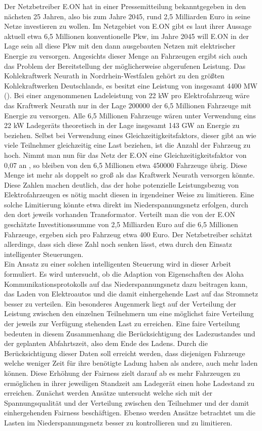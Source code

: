 Der Netzbetreiber E.ON hat in einer Pressemitteilung \cite{eon_presse} bekanntgegeben in den nächsten 25 Jahren, also bis zum Jahre 2045, rund 2,5 Milliarden Euro in seine Netze investieren zu wollen. Im Netzgebiet von E.ON gibt es laut ihrer Aussage aktuell etwa 6,5 Millionen konventionelle Pkw, im Jahre 2045 will E.ON in der Lage sein all diese Pkw mit den dann ausgebauten Netzen mit elektrischer Energie zu versorgen. Angesichts dieser Menge an Fahrzeugen ergibt sich auch das Problem der Bereitstellung der möglicherweise abgerufenen Leistung. Das Kohlekraftwerk Neurath in Nordrhein-Westfalen gehört zu den größten Kohlekraftwerken Deutschlands, es besitzt eine Leistung von insgesamt 4400 MW (\cite{power}). Bei einer angenommenen Ladeleistung von 22 kW pro Elektrofahrzeug wäre das Kraftwerk Neurath nur in der Lage 200000 der 6,5 Millionen Fahrzeuge mit Energie zu versorgen. Alle 6,5 Millionen Fahrzeuge wären unter Verwendung eins 22 kW Ladegeräts theoretisch in der Lage insgesamt 143 GW an Energie zu beziehen. 
Selbst bei Verwendung eines Gleichzeitigkeitsfaktors, dieser gibt an wie viele Teilnehmer gleichzeitig eine Last beziehen, ist die Anzahl der Fahrzeug zu hoch. Nimmt man nun für das Netz der E.ON eine Gleichzeitigkeitsfaktor von 0,07 an \cite{gust_2014}, so bleiben von den 6,5 Millionen etwa 450000 Fahrzeuge übrig. Diese Menge ist mehr als doppelt so groß als das Kraftwerk Neurath versorgen könnte. Diese Zahlen machen deutlich, das der hohe potenzielle Leistungsbezug von Elektrofahrzeugen es nötig macht diesen in irgendeiner Weise zu limitieren. Eine solche Limitierung könnte etwa direkt im Niederspannungsnetz erfolgen, durch den dort jeweils vorhanden Transformator. Verteilt man die von der E.ON geschätzte Investitionssumme von 2,5 Milliarden Euro auf die 6,5 Millionen Fahrzeuge, ergeben sich pro Fahrzeug etwa 400 Euro. Der Netzbetreiber schätzt allerdings, dass sich diese Zahl noch senken lässt, etwa durch den Einsatz intelligenter Steuerungen. \\
Ein Ansatz zu einer solchen intelligenten Steuerung wird in dieser Arbeit formuliert. Es wird untersucht, ob die Adaption von Eigenschaften des Aloha Kommunikationsprotokolls auf das Niederspannungsnetz dazu beitragen kann, das Laden von Elektroautos und die damit einhergehende Last auf das Stromnetz besser zu verteilen. Ein besonderes Augenmerk liegt auf der Verteilung der Leistung zwischen den einzelnen Teilnehmern um eine möglichst faire Verteilung der jeweils zur Verfügung stehenden Last zu erreichen. Eine faire Verteilung bedeuten in diesem Zusammenhang die Berücksichtigung des Ladezustandes und der geplanten Abfahrtszeit, also dem Ende des Ladens. Durch die Berücksichtigung dieser Daten soll erreicht werden, dass diejenigen Fahrzeuge welche weniger Zeit für ihre benötigte Ladung haben als andere, auch mehr laden können. Diese Erhöhung der Fairness zielt darauf ab es mehr Fahrzeugen zu ermöglichen in ihrer jeweiligen Standzeit am Ladegerät einen hohe Ladestand zu erreichen. Zunächst werden Ansätze untersucht welche sich mit der Spannungsqualität und der Verteilung zwischen den Teilnehmer und der damit einhergehenden Fairness beschäftigen. Ebenso werden Ansätze betrachtet um die Lasten im Niederspannungsnetz besser zu kontrollieren und zu limitieren.